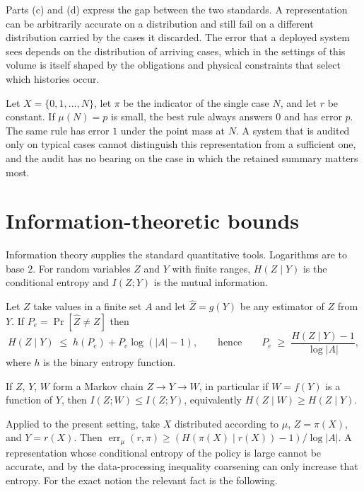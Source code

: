 Parts (c) and (d) express the gap between the two standards. A representation can be arbitrarily accurate on a distribution and still fail on a different distribution carried by the cases it discarded. The error that a deployed system sees depends on the distribution of arriving cases, which in the settings of this volume is itself shaped by the obligations and physical constraints that select which histories occur.

\begin{example}\label{ex:rare}
Let $X=\{0,1,\dots,N\}$, let $\pi$ be the indicator of the single case $N$, and let $r$ be constant. If $\mu(N)=p$ is small, the best rule always answers $0$ and has error $p$. The same rule has error $1$ under the point mass at $N$. A system that is audited only on typical cases cannot distinguish this representation from a sufficient one, and the audit has no bearing on the case in which the retained summary matters most.
\end{example}

\section{Information-theoretic bounds}

Information theory supplies the standard quantitative tools. Logarithms are to base $2$. For random variables $Z$ and $Y$ with finite ranges, $H(Z\mid Y)$ is the conditional entropy and $I(Z;Y)$ is the mutual information.

\begin{established}\label{thm:fano}
Let $Z$ take values in a finite set $A$ and let $\hat Z=g(Y)$ be any estimator of $Z$ from $Y$. If $P_e=\Pr[\hat Z\ne Z]$ then
\[
H(Z\mid Y)\;\le\;h(P_e)+P_e\log(|A|-1),\qquad\text{hence}\qquad P_e\;\ge\;\frac{H(Z\mid Y)-1}{\log|A|},
\]
where $h$ is the binary entropy function.
\end{established}

\begin{established}\label{thm:dpi}
If $Z$, $Y$, $W$ form a Markov chain $Z\to Y\to W$, in particular if $W=f(Y)$ is a function of $Y$, then $I(Z;W)\le I(Z;Y)$, equivalently $H(Z\mid W)\ge H(Z\mid Y)$.
\end{established}

Applied to the present setting, take $X$ distributed according to $\mu$, $Z=\pi(X)$, and $Y=r(X)$. Then $\operatorname{err}_\mu(r,\pi)\ge(H(\pi(X)\mid r(X))-1)/\log|A|$. A representation whose conditional entropy of the policy is large cannot be accurate, and by the data-processing inequality coarsening can only increase that entropy. For the exact notion the relevant fact is the following.

